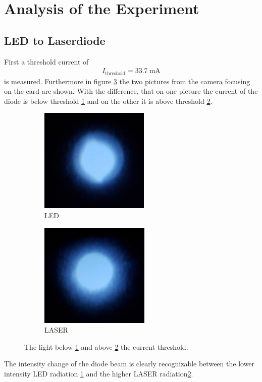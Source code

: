 \section{Analysis of the Experiment}
\label{sec:Auswertung}



\subsection{LED to Laserdiode}
\label{sec:LED_Laser}
First a threshold current of
\begin{align}
I_{\mathrm{threshold}} = \SI{33,7}{\milli\ampere}
\end{align}
is measured.
Furthermore in figure \ref{fig:threshold} the two
pictures from the camera focusing on the card are shown.
With the difference, that on one picture the current of the diode is below threshold \ref{fig:LED} and
on the other it is above threshold \ref{fig:LASER}.
\begin{figure}
  \centering
  \begin{subfigure}{0.45\textwidth}
    \centering
    \includegraphics[height = 5cm]{figures/bevore_threshole.jpg}
    \caption{LED}
    \label{fig:LED}
  \end{subfigure}
  \begin{subfigure}{0.45\textwidth}
    \centering
    \includegraphics[height = 5cm]{figures/after_threshole.jpg}
    \caption{LASER}
    \label{fig:LASER}
  \end{subfigure}
\caption{The light below \ref{fig:LED} and above \ref{fig:LASER} the current threshold.}
\label{fig:threshold}
\end{figure}
The intensity change of the diode beam is clearly recognizable
between the lower intensity LED radiation \ref{fig:LED}
and the higher LASER radiation\ref{fig:LASER}.


